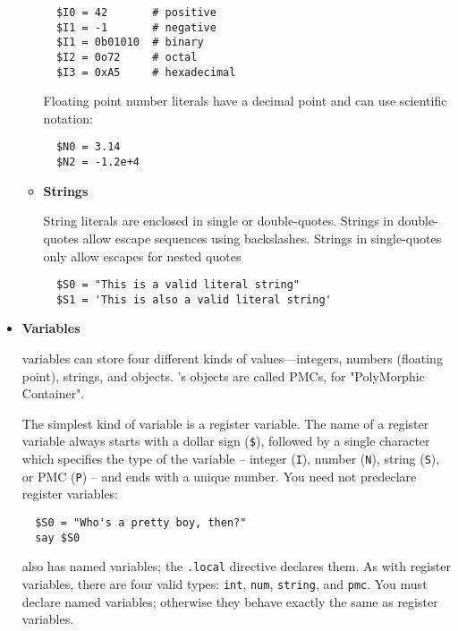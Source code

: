 \begin{itemize}
\begin{itemize}
\begin{verbatim}
  $I0 = 42       # positive
  $I1 = -1       # negative
  $I1 = 0b01010  # binary
  $I2 = 0o72     # octal
  $I3 = 0xA5     # hexadecimal
\end{verbatim}

Floating point number literals have a decimal point and can use scientific notation:

\begin{verbatim}
  $N0 = 3.14
  $N2 = -1.2e+4
\end{verbatim}

\item {\bf Strings }

String literals are enclosed in single or double-quotes.
Strings in double-quotes allow escape sequences using backslashes.
Strings in single-quotes only allow escapes for nested quotes

\begin{verbatim}
  $S0 = "This is a valid literal string"
  $S1 = 'This is also a valid literal string'
\end{verbatim}
\end{itemize}

\item {\bf Variables }

 variables can store four different kinds of values—integers,
numbers (floating point), strings, and objects. 's objects
are called PMCs, for "PolyMorphic Container".

The simplest kind of variable is a register variable. The name of
a register variable always starts with a dollar sign (\verb|$|), followed
by a single character which specifies the type of the variable --
integer (\verb|I|), number (\verb|N|), string (\verb|S|), or PMC (\verb|P|) 
-- and ends with a unique number. You need not predeclare register variables:

\begin{verbatim}
  $S0 = "Who's a pretty boy, then?"
  say $S0
\end{verbatim}

 also has named variables; the \verb|.local| directive declares them.
As with register variables, there are four valid types: \verb|int|, \verb|num|,
\verb|string|, and \verb|pmc|. You must declare named variables; otherwise they
behave exactly the same as register variables.


\end{itemize}
